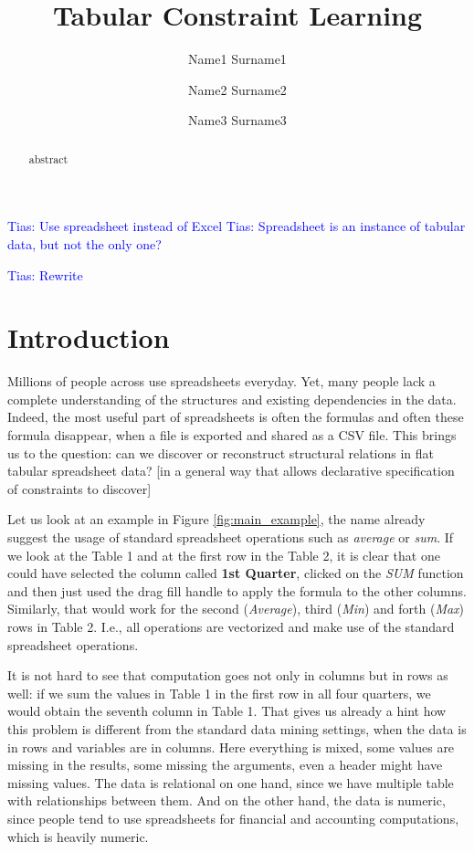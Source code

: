 \documentclass{ecai}
\newcommand{\tias}[1]{\textcolor{blue}{{\sc Tias:} #1}\xspace}
\begin{document}
\title{Tabular Constraint Learning}

\author{Name1 Surname1 \and Name2 Surname2 \and Name3 Surname3  }

\maketitle

\begin{abstract}
  abstract
\end{abstract}

\tias{Use spreadsheet instead of Excel}
\tias{Spreadsheet is an instance of tabular data, but not the only one?}

\tias{Rewrite}
\section{Introduction}
Millions of people across use spreadsheets everyday. Yet, many people lack a complete understanding of the structures and existing dependencies in the data. Indeed, the most useful part of spreadsheets is often the formulas and often these formula disappear, when a file is exported and shared as a CSV file. This brings us to the question: can we discover or reconstruct structural relations in flat tabular spreadsheet data? [in a general way that allows declarative specification of constraints to discover]

Let us look at an example in Figure \ref{fig:main_example}, the name already suggest the usage of standard spreadsheet operations such as \textit{average} or \textit{sum}. If we look at the Table 1 and at the first row in the Table 2, it is clear that one could have selected the column called \textbf{1st Quarter}, clicked on the \textit{SUM} function and then just used the drag fill handle to apply the formula to the other columns. Similarly, that would work for the second (\textit{Average}), third (\textit{Min})  and forth (\textit{Max}) rows in Table 2. I.e., all operations are vectorized and make use of the standard spreadsheet operations. 

It is not hard to see that computation goes not only in columns but in rows as well: if we sum the values in Table 1 in the first row in all four quarters, we would obtain the seventh column in Table 1. That gives us already a hint how this problem is different from the standard data mining settings, when the data is in rows and variables are in columns. Here everything is mixed, some values are missing in the results, some missing the arguments, even a header might have missing values. The data is relational on one hand, since we have multiple table with relationships between them. And on the other hand, the data is numeric, since people tend to use spreadsheets for financial and accounting computations, which is heavily numeric.
\end{document}

